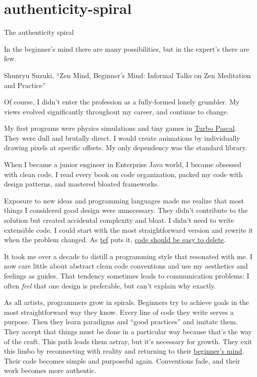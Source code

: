 \documentclass{article}
\begin{document}
\section{authenticity-spiral}{The authenticity spiral}

\epigraph{
  In the beginner's mind there are many possibilities, but in the expert's there are few.
}{
  Shunryu Suzuki, ``Zen Mind, Beginner's Mind: Informal Talks on Zen Meditation and Practice''
}

Of course, I didn't enter the profession as a fully-formed lonely grumbler.
My views evolved significantly throughout my career, and continue to change.

My first programs were physics simulations and tiny games in \href{https://en.wikipedia.org/wiki/Turbo_Pascal}{Turbo Pascal}.
They were dull and brutally direct.
I would create animations by individually drawing pixels at specific offsets.
My only dependency was the standard library.

When I became a junior engineer in Enterprise Java world, I became obsessed with clean code.
I read every book on code organization, packed my code with design patterns, and mastered bloated frameworks.

Exposure to new ideas and programming languages made me realize that most things I considered good design were unnecessary.
They didn't contribute to the solution but created accidental complexity and bloat.
I didn't need to write extensible code.
I could start with the most straightforward version and rewrite it when the problem changed.
As \href{https://programmingisterrible.com/about}{tef} puts it, \href{https://programmingisterrible.com/post/139222674273/write-code-that-is-easy-to-delete-not-easy-to}{code should be easy to delete}.

It took me over a decade to distill a programming style that resonated with me.
I now care little about abstract clean code conventions and use my aesthetics and feelings as guides.
That tendency sometimes leads to communication problems: I often \emph{feel} that one design is preferable, but can't explain why exactly.

As all artists, programmers grow in spirals.
Beginners try to achieve goals in the most straightforward way they know.
Every line of code they write serves a purpose. Then they learn paradigms and ``good practices'' and imitate them.
They accept that things must be done in a particular way because that's the way of the craft.
This path leads them astray, but it's necessary for growth.
They exit this limbo by reconnecting with reality and returning to their \href{https://en.wikipedia.org/wiki/Shoshin}{beginner's mind}.
Their code becomes simple and purposeful again.
Conventions fade, and their work becomes more authentic.
\end{document}
